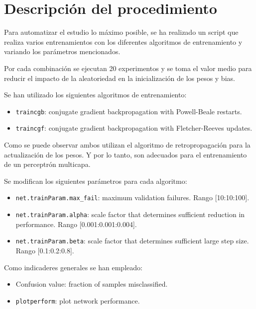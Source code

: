 \documentclass[a4paper,12pt,titlepage]{article}
\begin{document}
\section{Descripción del procedimiento}

Para automatizar el estudio lo máximo posible, se ha realizado un script que realiza varios entrenamientos con los diferentes algoritmos de entrenamiento y variando los parámetros mencionados. 

Por cada combinación se ejecutan 20 experimentos y se toma el valor medio para reducir el impacto de la aleatoriedad en la inicialización de los pesos y bias.

Se han utilizado los siguientes algoritmos de entrenamiento:

\begin{itemize}[noitemsep]
	\item \lstinline|traincgb|: conjugate gradient backpropagation with Powell-Beale restarts. \citep{matlab:traincgb}
	\item \lstinline|traincgf|: conjugate gradient backpropagation with Fletcher-Reeves updates. \citep{matlab:traincgf}
\end{itemize}

Como se puede observar ambos utilizan el algoritmo de retropropagación para la actualización de los pesos. Y por lo tanto, son adecuados para el entrenamiento de un perceptrón multicapa.

Se modifican los siguientes parámetros para cada algoritmo:

\begin{itemize}[noitemsep]
	\item \lstinline|net.trainParam.max_fail|: maximum validation failures. Rango [10:10:100].
	\item \lstinline|net.trainParam.alpha|: scale factor that determines sufficient reduction in performance. Rango [0.001:0.001:0.004].
	\item \lstinline|net.trainParam.beta|: scale factor that determines sufficient large step size. Rango [0.1:0.2:0.8].
\end{itemize}

Como indicaderes generales se han empleado:

\begin{itemize}[noitemsep]
	\item Confusion value: fraction of samples misclassified.
	\item \lstinline|plotperform|: plot network performance. \citep{matlab:plotperform}
\end{itemize}
\end{document}
